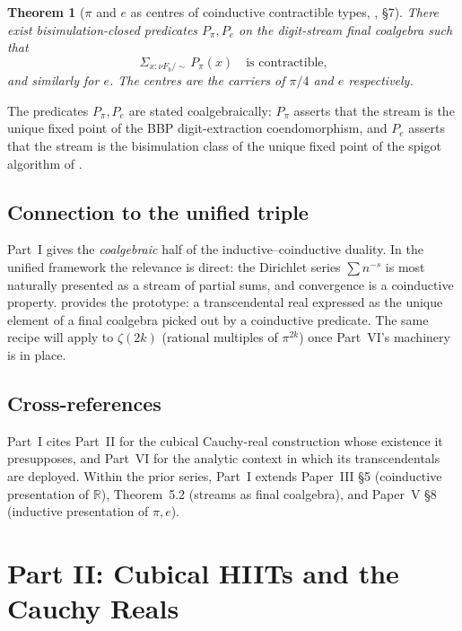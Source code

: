 \documentclass[12pt]{article}
\newtheorem{theorem}{Theorem}[section]
\theoremstyle{definition}
\theoremstyle{remark}
\newcommand{\R}{\mathbb{R}}
\newcommand{\bisim}{\mathrel{\sim}}
\begin{document}
\begin{theorem}[$\pi$ and $e$ as centres of coinductive contractible
types, \cite{coalgebraicTranscendentals}, \S 7]\label{thm:partI:pi-e}
There exist bisimulation-closed predicates $P_\pi, P_e$ on the digit-stream
final coalgebra such that
\[
\Sigma_{x : \nu F_b / \bisim}\, P_\pi(x) \quad\text{is contractible,}
\]
and similarly for $e$. The centres are the carriers of $\pi/4$ and $e$
respectively.
\end{theorem}

The predicates $P_\pi, P_e$ are stated coalgebraically: $P_\pi$ asserts
that the stream is the unique fixed point of the BBP digit-extraction
coendomorphism, and $P_e$ asserts that the stream is the bisimulation
class of the unique fixed point of the spigot algorithm of
\cite{rabwagon-spigot,gibbons-spigot}.

\subsection{Connection to the unified triple}

Part~I gives the \emph{coalgebraic} half of the inductive--coinductive
duality. In the unified framework the relevance is direct: the
Dirichlet series $\sum n^{-s}$ is most naturally presented as a stream of
partial sums, and convergence is a coinductive property. 
provides the prototype: a transcendental real expressed as the
unique element of a final coalgebra picked out by a coinductive predicate.
The same recipe will apply to $\zeta(2k)$ (rational multiples of $\pi^{2k}$)
once Part~VI's machinery is in place.

\subsection{Cross-references}

Part~I cites Part~II for the cubical Cauchy-real construction whose
existence it presupposes, and Part~VI for the analytic context in which
its transcendentals are deployed. Within the prior series, Part~I extends
Paper~III \S 5 (coinductive presentation of $\R$), Theorem~5.2 (streams as
final coalgebra), and Paper~V \S 8 (inductive presentation of $\pi, e$).

\section{Part II: Cubical HIITs and the Cauchy Reals}\label{sec:partII}
\end{document}

